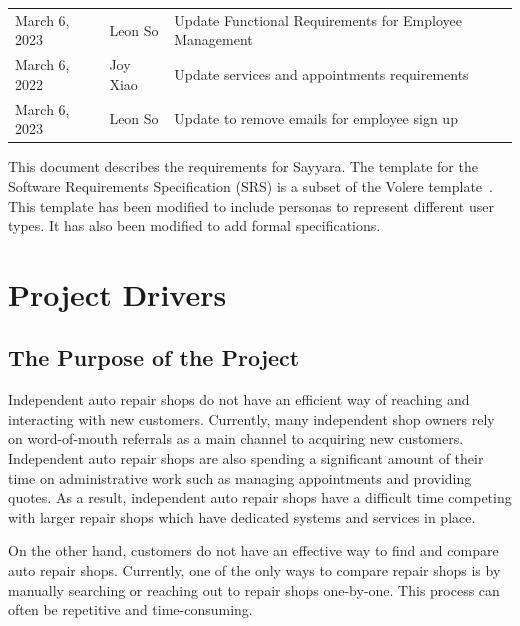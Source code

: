 \documentclass[12pt]{article}
\begin{document}
\begin{longtable}{p{} p{} p{}}
	March 6, 2023      & Leon So               & Update Functional Requirements for Employee Management                             \\
	March 6, 2022      & Joy Xiao              & Update services and appointments requirements                                      \\
	March 6, 2023      & Leon So               & Update to remove emails for employee sign up                                       \\
	\bottomrule
\end{longtable}

\newpage


This document describes the requirements for Sayyara. The template for the Software Requirements
Specification (SRS) is a subset of the Volere template~\citep{RobertsonAndRobertson2012}. This
template has been modified to include personas to represent different user types. It has also been
modified to add formal specifications.

\section{Project Drivers}

\subsection{The Purpose of the Project}

Independent auto repair shops do not have an efficient way of reaching and interacting with new
customers. Currently, many independent shop owners rely on word-of-mouth referrals as a main
channel to acquiring new customers. Independent auto repair shops are also spending a significant
amount of their time on administrative work such as managing appointments and providing quotes. As
a result, independent auto repair shops have a difficult time competing with larger repair shops
which have dedicated systems and services in place.

On the other hand, customers do not have an effective way to find and compare auto repair shops.
Currently, one of the only ways to compare repair shops is by manually searching or reaching out to
repair shops one-by-one. This process can often be repetitive and time-consuming.
\end{document}
